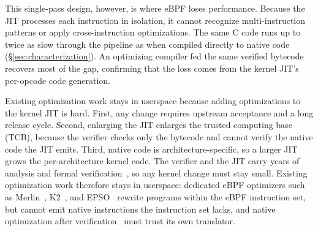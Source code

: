 This single-pass design, however, is where eBPF loses performance.
Because the JIT processes each instruction in isolation, it cannot recognize multi-instruction patterns or apply cross-instruction optimizations.
The same C code runs up to twice as slow through the pipeline as when compiled directly to native code (\S\ref{sec:characterization}).
An optimizing compiler fed the same verified bytecode recovers most of the gap, confirming that the loss comes from the kernel JIT's per-opcode code generation.

Existing optimization work stays in userspace because adding optimizations to the kernel JIT is hard.
First, any change requires upstream acceptance and a long release cycle.
Second, enlarging the JIT enlarges the trusted computing base (TCB), because the verifier checks only the bytecode and cannot verify the native code the JIT emits.
Third, native code is architecture-specific, so a larger JIT grows the per-architecture kernel code.
The verifier and the JIT carry years of analysis and formal verification~\cite{nelson2020specification,vishwanathan2023verifying}, so any kernel change must stay small.
Existing optimization work therefore stays in userspace: dedicated eBPF optimizers such as Merlin~\cite{mao2024merlin}, K2~\cite{xu2021synthesizing}, and EPSO~\cite{zhu2025epso} rewrite programs within the eBPF instruction set, but cannot emit native instructions the instruction set lacks, and native optimization after verification~\cite{shahinfar2026fun} must trust its own translator.

